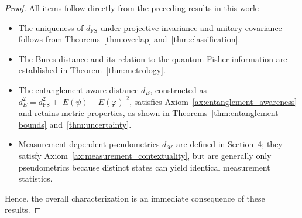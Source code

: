 \documentclass[aps,pra,reprint,nofootinbib,showpacs,superscriptaddress]{revtex4-1}
\begin{document}
\begin{proof}
All items follow directly from the preceding results in this work:

\begin{itemize}
    \item[(i)] The uniqueness of $d_{\text{FS}}$ under projective invariance and unitary covariance follows from Theorems~\ref{thm:overlap} and~\ref{thm:classification}.
    \item[(ii)] The Bures distance and its relation to the quantum Fisher information are established in Theorem~\ref{thm:metrology}.
    \item[(iii)] The entanglement-aware distance $d_E$, constructed as $d_E^2 = d_{\text{FS}}^2 + |E(\psi)-E(\varphi)|^2$, satisfies Axiom~\ref{ax:entanglement_awareness} and retains metric properties, as shown in Theorems~\ref{thm:entanglement-bounds} and~\ref{thm:uncertainty}.
    \item[(iv)] Measurement-dependent pseudometrics $d_{\mathcal{M}}$ are defined in Section~4; they satisfy Axiom~\ref{ax:measurement_contextuality}, but are generally only pseudometrics because distinct states can yield identical measurement statistics.
\end{itemize}

Hence, the overall characterization is an immediate consequence of these results.
\end{proof}

\end{document}
